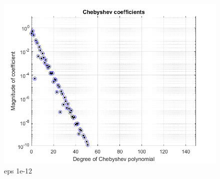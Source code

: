 \documentclass{article}
\begin{document}
\begin{figure}[h!]
\centering
\includegraphics[scale=.5]{-12f.png}
\caption{eps 1e-12}
\label{fig:-12f}
\end{figure}
\end{document}
